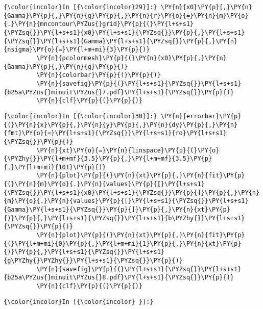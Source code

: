     \begin{Verbatim}[commandchars=\\\{\}]
{\color{incolor}In [{\color{incolor}29}]:} \PY{n}{x0}\PY{p}{,}\PY{n}{Gamma}\PY{p}{,}\PY{n}{g}\PY{p}{,}\PY{n}{r}\PY{o}{=}\PY{n}{m}\PY{o}{.}\PY{n}{mncontour\PYZus{}grid}\PY{p}{(}\PY{l+s+s1}{\PYZsq{}}\PY{l+s+s1}{x0}\PY{l+s+s1}{\PYZsq{}}\PY{p}{,}\PY{l+s+s1}{\PYZsq{}}\PY{l+s+s1}{Gamma}\PY{l+s+s1}{\PYZsq{}}\PY{p}{,}\PY{n}{nsigma}\PY{o}{=}\PY{l+m+mi}{3}\PY{p}{)}
         \PY{n}{pcolormesh}\PY{p}{(}\PY{n}{x0}\PY{p}{,}\PY{n}{Gamma}\PY{p}{,}\PY{n}{g}\PY{p}{)}
         \PY{n}{colorbar}\PY{p}{(}\PY{p}{)}
         \PY{n}{savefig}\PY{p}{(}\PY{l+s+s1}{\PYZsq{}}\PY{l+s+s1}{b25a\PYZus{}minuit\PYZus{}7.pdf}\PY{l+s+s1}{\PYZsq{}}\PY{p}{)}
         \PY{n}{clf}\PY{p}{(}\PY{p}{)}
\end{Verbatim}


    \begin{Verbatim}[commandchars=\\\{\}]
{\color{incolor}In [{\color{incolor}30}]:} \PY{n}{errorbar}\PY{p}{(}\PY{n}{x}\PY{p}{,}\PY{n}{y}\PY{p}{,}\PY{n}{dy}\PY{p}{,}\PY{n}{fmt}\PY{o}{=}\PY{l+s+s1}{\PYZsq{}}\PY{l+s+s1}{ro}\PY{l+s+s1}{\PYZsq{}}\PY{p}{)}
         \PY{n}{xt}\PY{o}{=}\PY{n}{linspace}\PY{p}{(}\PY{o}{\PYZhy{}}\PY{l+m+mf}{3.5}\PY{p}{,}\PY{l+m+mf}{3.5}\PY{p}{,}\PY{l+m+mi}{101}\PY{p}{)}
         \PY{n}{plot}\PY{p}{(}\PY{n}{xt}\PY{p}{,}\PY{n}{fit}\PY{p}{(}\PY{n}{m}\PY{o}{.}\PY{n}{values}\PY{p}{[}\PY{l+s+s1}{\PYZsq{}}\PY{l+s+s1}{x0}\PY{l+s+s1}{\PYZsq{}}\PY{p}{]}\PY{p}{,}\PY{n}{m}\PY{o}{.}\PY{n}{values}\PY{p}{[}\PY{l+s+s1}{\PYZsq{}}\PY{l+s+s1}{Gamma}\PY{l+s+s1}{\PYZsq{}}\PY{p}{]}\PY{p}{,}\PY{n}{xt}\PY{p}{)}\PY{p}{,}\PY{l+s+s1}{\PYZsq{}}\PY{l+s+s1}{b\PYZhy{}}\PY{l+s+s1}{\PYZsq{}}\PY{p}{)}
         \PY{n}{plot}\PY{p}{(}\PY{n}{xt}\PY{p}{,}\PY{n}{fit}\PY{p}{(}\PY{l+m+mi}{0}\PY{p}{,}\PY{l+m+mi}{1}\PY{p}{,}\PY{n}{xt}\PY{p}{)}\PY{p}{,}\PY{l+s+s1}{\PYZsq{}}\PY{l+s+s1}{g\PYZhy{}\PYZhy{}}\PY{l+s+s1}{\PYZsq{}}\PY{p}{)}
         \PY{n}{savefig}\PY{p}{(}\PY{l+s+s1}{\PYZsq{}}\PY{l+s+s1}{b25a\PYZus{}minuit\PYZus{}8.pdf}\PY{l+s+s1}{\PYZsq{}}\PY{p}{)}
         \PY{n}{clf}\PY{p}{(}\PY{p}{)}
\end{Verbatim}


    \begin{Verbatim}[commandchars=\\\{\}]
{\color{incolor}In [{\color{incolor} }]:} 
\end{Verbatim}
